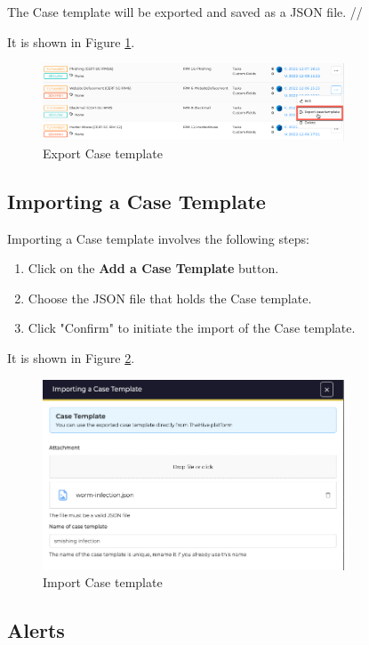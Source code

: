 \documentclass{article}
\begin{document}
The Case template will be exported and saved as a JSON file. //

It is shown in Figure \ref{fig:export}.
\begin{figure}[h!]
    \centering
    \includegraphics[width=0.8\textwidth]{img23.png}
    \caption{Export Case template}
    \label{fig:export}
\end{figure}

\subsection*{Importing a Case Template}

Importing a Case template involves the following steps:

\begin{enumerate}
  \item Click on the \textbf{Add a Case Template} button.
  \item Choose the JSON file that holds the Case template.
  \item Click "Confirm" to initiate the import of the Case template.
\end{enumerate}

It is shown in Figure \ref{fig:import}.
\begin{figure}[h!]
    \centering
    \includegraphics[width=0.8\textwidth]{img24.png}
    \caption{Import Case template}
    \label{fig:import}
\end{figure}

\subsection{Alerts}
\end{document}
